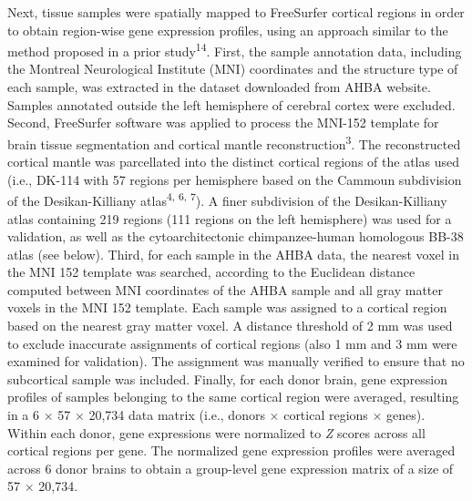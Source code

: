 \begin{refsection}
Next, tissue samples were spatially mapped to FreeSurfer cortical regions in order to obtain region-wise gene expression profiles, using an approach similar to the method proposed in a prior study\textsuperscript{14}. First, the sample annotation data, including the Montreal Neurological Institute (MNI) coordinates and the structure type of each sample, was extracted in the dataset downloaded from AHBA website. Samples annotated outside the left hemisphere of cerebral cortex were excluded. Second, FreeSurfer software was applied to process the MNI-152 template for brain tissue segmentation and cortical mantle reconstruction\textsuperscript{3}. The reconstructed cortical mantle was parcellated into the distinct cortical regions of the atlas used (i.e., DK-114 with 57 regions per hemisphere based on the Cammoun subdivision of the Desikan-Killiany atlas\textsuperscript{4, 6, 7}). A finer subdivision of the Desikan-Killiany atlas containing 219 regions (111 regions on the left hemisphere) was used for a validation, as well as the cytoarchitectonic chimpanzee-human homologous BB-38 atlas (see below). Third, for each sample in the AHBA data, the nearest voxel in the MNI 152 template was searched, according to the Euclidean distance computed between MNI coordinates of the AHBA sample and all gray matter voxels in the MNI 152 template. Each sample was assigned to a cortical region based on the nearest gray matter voxel. A distance threshold of 2 mm was used to exclude inaccurate assignments of cortical regions (also 1 mm and 3 mm were examined for validation). The assignment was manually verified to ensure that no subcortical sample was included. Finally, for each donor brain, gene expression profiles of samples belonging to the same cortical region were averaged, resulting in a 6 $ \times $  57 $ \times $  20,734 data matrix (i.e., donors $ \times $  cortical regions $ \times $  genes). Within each donor, gene expressions were normalized to \textit{Z} scores across all cortical regions per gene. The normalized gene expression profiles were averaged across 6 donor brains to obtain a group-level gene expression matrix of a size of 57 $ \times $  20,734.


\end{refsection}
